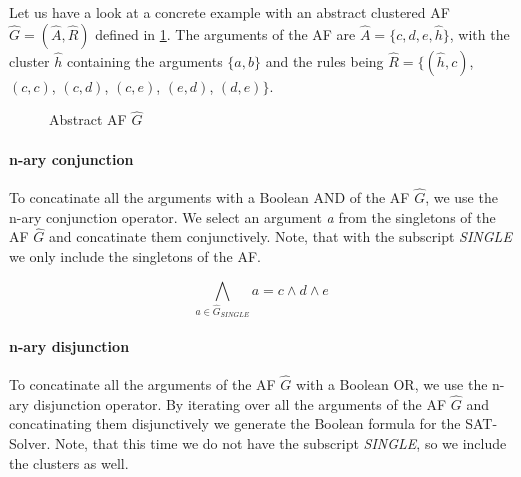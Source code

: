 \begin{example}
Let us have a look at a concrete example with an abstract clustered AF $\hat{G}=(\hat{A}, \hat{R})$ defined in \cref{af:implementationSATExample1}. The arguments of the AF are $\hat{A}=\{c, d, e, \hat{h}\}$, with the cluster $\hat{h}$ containing the arguments $\{a, b\}$ and the rules being $\hat{R}=\bigl\{ (\hat{h}, c)$, $(c, c)$, $(c, d)$, $(c, e)$, $(e, d)$, $(d, e)\bigl\}$.

\begin{figure}[h]
    \centering
    \caption{Abstract AF $\hat{G}$}
    \label{af:implementationSATExample1}
\end{figure}


\paragraph{n-ary conjunction} To concatinate all the arguments with a Boolean AND of the AF \emph{$\hat{G}$}, we use the n-ary conjunction operator. We select an argument \emph{a} from the singletons of the AF \emph{$\hat{G}$} and concatinate them conjunctively. Note, that with the subscript \emph{SINGLE} we only include the singletons of the AF.

$$
\bigwedge_{a \in \hat{G}_{\!S\!I\!N\!G\!L\!E}} a = c \land d \land e
$$


\paragraph{n-ary disjunction} To concatinate all the arguments of the AF \emph{$\hat{G}$} with a Boolean OR, we use the n-ary disjunction operator. By iterating over all the arguments of the AF \emph{$\hat{G}$} and concatinating them disjunctively we generate the Boolean formula for the SAT-Solver. Note, that this time we do not have the subscript \emph{SINGLE}, so we include the clusters as well.


\end{example}
